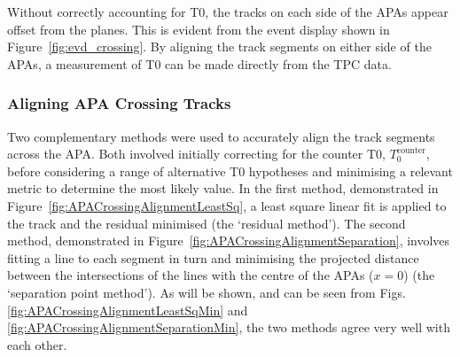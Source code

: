 Without correctly accounting for T0, the tracks on each side of the APAs appear offset from the planes.  This is evident from the event display shown in Figure~\ref{fig:evd_crossing}.  By aligning the track segments on either side of the APAs, a measurement of T0 can be made directly from the TPC data.

\subsubsection{Aligning APA Crossing Tracks}\label{sec:APACrossingAlignment}

Two complementary methods were used to accurately align the track segments across the APA.  Both involved initially correcting for the counter T0, $T_0^{\mathrm{counter}}$, before considering a range of alternative T0 hypotheses and minimising a relevant metric to determine the most likely value.  In the first method, demonstrated in Figure~\ref{fig:APACrossingAlignmentLeastSq}, a least square linear fit is applied to the track and the residual minimised (the `residual method').  The second method, demonstrated in Figure~\ref{fig:APACrossingAlignmentSeparation}, involves fitting a line to each segment in turn and minimising the projected distance between the intersections of the lines with the centre of the APAs ($x=0$) (the `separation point method').  As will be shown, and can be seen from Figs. \ref{fig:APACrossingAlignmentLeastSqMin} and \ref{fig:APACrossingAlignmentSeparationMin}, the two methods agree very well with each other.

